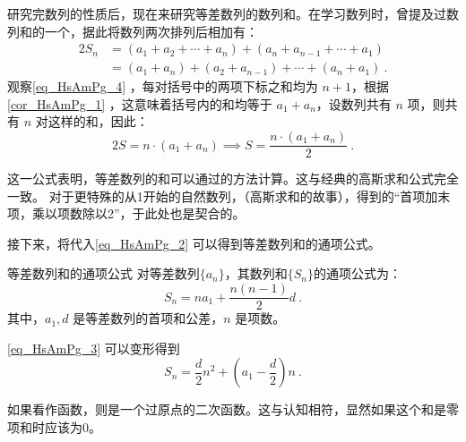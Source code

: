 研究完数列的性质后，现在来研究等差数列的数列和。在学习数列时，曾提及过数列和的一个，据此将数列两次排列后相加有：
\begin{equation}\label{eq_HsAmPg_4}
\begin{split}
2S_n &= (a_1 + a_2 + \cdots + a_n)+(a_n + a_{n-1} + \cdots + a_1)\\
&=(a_1+a_{n})+(a_2+a_{n-1}) +\cdots +(a_n+a_1)~.
\end{split}
\end{equation}
观察\autoref{eq_HsAmPg_4} ，每对括号中的两项下标之和均为 $n+1$，根据\autoref{cor_HsAmPg_1} ，这意味着括号内的和均等于 $a_1 + a_n$，设数列共有 $n$ 项，则共有 $n$ 对这样的和，因此：
\begin{equation}\label{eq_HsAmPg_2}
2S = n \cdot (a_1+a_n)\implies S = \frac{n\cdot(a_1+a_n)}{2}~.
\end{equation}

这一公式表明，等差数列的和可以通过的方法计算。这与经典的高斯求和公式完全一致。
对于更特殊的从1开始的自然数列，（高斯求和的故事），得到的“首项加末项，乘以项数除以2”，于此处也是契合的。

接下来，将代入\autoref{eq_HsAmPg_2} 可以得到等差数列和的通项公式。
\begin{corollary}{等差数列和的通项公式}
对等差数列$\{a_n\}$，其数列和$\{S_n\}$的通项公式为：
\begin{equation}\label{eq_HsAmPg_3}
S_n = na_1+\frac{n(n-1)}{2}d~.
\end{equation}
其中，$a_1,d$ 是等差数列的首项和公差，$n$ 是项数。
\end{corollary}

\autoref{eq_HsAmPg_3} 可以变形得到
\begin{equation}
S_n = \frac{d}{2}n^2+\left(a_1-\frac{d}{2}\right)n~.
\end{equation}

如果看作函数，则是一个过原点的二次函数。这与认知相符，显然如果这个和是零项和时应该为$0$。



